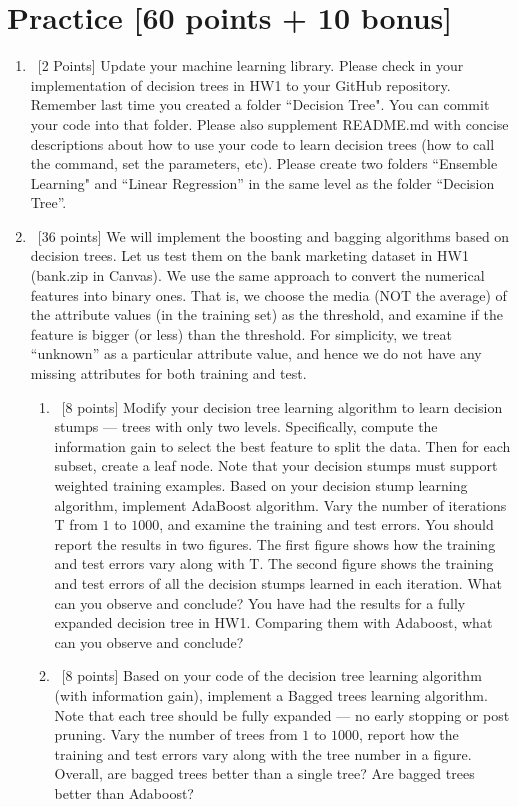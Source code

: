 \documentclass[12pt, fullpage,letterpaper]{article}
\begin{document}
\section{Practice [60 points + 10 bonus]}
\begin{enumerate}
	\item~[2 Points] Update your machine learning library. Please check in your implementation of decision trees in HW1 to your GitHub repository. Remember last time you created a folder ``Decision Tree". You can commit your code into that folder. Please also supplement README.md with concise descriptions about how to use your code to learn decision trees (how to call the command, set the parameters, etc). Please create two folders ``Ensemble Learning" and ``Linear Regression''  in the same level as the folder ``Decision Tree''.  


\item~[36 points] We will implement the boosting and bagging algorithms based on decision trees.  Let us test them on the bank marketing dataset in HW1 (bank.zip in Canvas). We use the same approach to convert the numerical features into binary ones. That is, we choose the media (NOT the average) of the attribute values (in the training set) as the threshold, and examine if the feature is bigger (or less) than the threshold.  For simplicity, we treat ``unknown'' as a particular attribute value, and hence we do not have any missing attributes for both training and test.
\begin{enumerate}
	\item~[8 points] Modify your decision tree learning algorithm to learn decision stumps ---  trees with only two levels. Specifically, compute the information gain to select the best feature to split the data. Then for each subset, create a leaf node. Note that your decision stumps must support weighted training examples. Based on your decision stump learning algorithm, implement AdaBoost algorithm. Vary the number of iterations T from $1$ to $1000$, and examine the training and test errors. You should report the results in two figures. The first figure shows how the training and test errors vary along with T. The second figure shows  the training and test errors of all the decision stumps learned in each iteration. What can you observe and conclude? You have had the results for a fully expanded decision tree in HW1. Comparing them with Adaboost, what can you observe and conclude?
	
	\item~[8 points] Based on your code of the decision tree learning algorithm (with information gain), implement a Bagged trees learning algorithm. Note that each tree should be fully expanded --- no early stopping or post pruning. Vary the number of trees from $1$ to $1000$, report how the training and test errors vary along with the tree number in a figure. Overall, are bagged trees better than a single tree? Are bagged trees better than Adaboost? 


\end{enumerate}
\end{enumerate}
\end{document}
